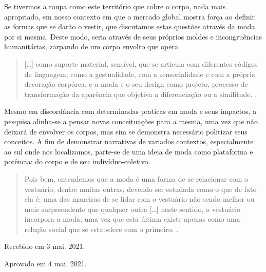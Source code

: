 \begin{refsection}
    Se tivermos a roupa como este território que cobre o corpo, nada mais apropriado, em nosso contexto em que o mercado global mostra força ao definir as formas que se darão o vestir, que discutamos estas questões através da moda por si mesma. Deste modo, seria através de seus próprios moldes e incongruências humanitárias, zarpando de um corpo envolto que opera  

    \begin{quotation}
        [\dots] como suporte material, sensível, que se articula com diferentes códigos de linguagem, como a gestualidade, com a sensorialidade e com a própria decoração corpórea, e a moda e o seu design como projeto, processo de transformação da aparência que objetiva a diferenciação ou a similitude. \cite[p.~31]{CastilhoAndMartins2005Discursos}.
    \end{quotation}

    Mesmo em discordância com determinadas praticas em moda e seus impactos, a pesquisa alinha-se a pensar novas conceituações para a mesma, uma vez que não deixará de envolver os corpos, mas sim se demonstra necessário politizar seus conceitos. A fim de demonstrar narrativas de variados contextos, especialmente ao sul onde nos localizamos, parte-se de uma ideia de moda como plataforma e potência: do corpo e de seu indivíduo-coletivo.

    \begin{quotation}
        Pois bem, entendemos que a moda é uma forma de se relacionar com o vestuário, dentre muitas outras, devendo ser estudada como o que de fato ela é: uma das maneiras de se lidar com o vestuário não sendo melhor ou mais surpreendente que qualquer outra [\dots] neste sentido, o vestuário incorpora a moda, uma vez que esta última existe apenas como uma relação social que se estabelece com o primeiro. \cite[p.~21]{Santos2020Analise}.
    \end{quotation}

    \printbibliography[heading=subbibliography,notcategory=fullcited]

    \hfill Recebido em 3 mai. 2021.

    \hfill Aprovado em 4 mai. 2021.

    \label{chap:dispositivoend}

\end{refsection}
